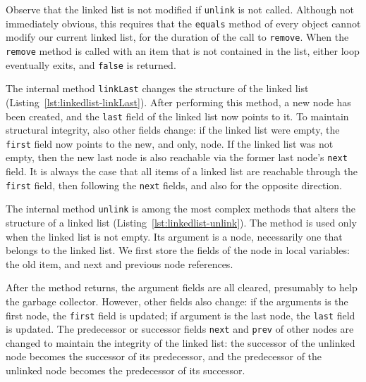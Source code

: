 \documentclass[runningheads]{llncs}
\begin{document}
Observe that the linked list is not modified if \texttt{unlink} is not called. Although not immediately obvious, this requires that the \texttt{equals} method of every object cannot modify our current linked list, for the duration of the call to \texttt{remove}. When the \texttt{remove} method is called with an item that is not contained in the list, either loop eventually exits, and \texttt{false} is returned.



The internal method \texttt{linkLast} changes the structure of the linked list (Listing~\ref{lst:linkedlist-linkLast}). After performing this method, a new node has been created, and the \texttt{last} field of the linked list now points to it. To maintain structural integrity, also other fields change: if the linked list were empty, the \texttt{first} field now points to the new, and only, node. If the linked list was not empty, then the new last node is also reachable via the former last node's \texttt{next} field. It is always the case that all items of a linked list are reachable through the \texttt{first} field, then following the \texttt{next} fields, and also for the opposite direction.



The internal method \texttt{unlink} is among the most complex methods that alters the structure of a linked list (Listing~\ref{lst:linkedlist-unlink}). The method is used only when the linked list is not empty. Its argument is a node, necessarily one that belongs to the linked list. We first store the fields of the node in local variables: the old item, and next and previous node references.

After the method returns, the argument fields are all cleared, presumably to help the garbage collector. However, other fields also change: if the arguments is the first node, the \texttt{first} field is updated; if argument is the last node, the \texttt{last} field is updated. The predecessor or successor fields \texttt{next} and \texttt{prev} of other nodes are changed to maintain the integrity of the linked list: the successor of the unlinked node becomes the successor of its predecessor, and the predecessor of the unlinked node becomes the predecessor of its successor.
\end{document}
